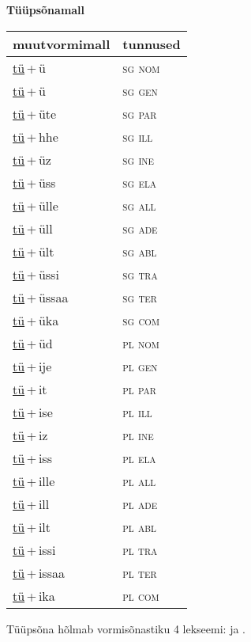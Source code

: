 
\vspace{1.8em}
\begin{minipage}{\textwidth}
\textbf{Tüüpsõnamall \,}\\

\begin{sideways}
\begin{tabular}{l l}
muutvormimall & tunnused \\
\hline
\underline{tü}\,+\,ü & \textsc{ sg nom } \\
\underline{tü}\,+\,ü & \textsc{ sg gen } \\
\underline{tü}\,+\,üte & \textsc{ sg par } \\
\underline{tü}\,+\,hhe & \textsc{ sg ill } \\
\underline{tü}\,+\,üz & \textsc{ sg ine } \\
\underline{tü}\,+\,üss & \textsc{ sg ela } \\
\underline{tü}\,+\,ülle & \textsc{ sg all } \\
\underline{tü}\,+\,üll & \textsc{ sg ade } \\
\underline{tü}\,+\,ült & \textsc{ sg abl } \\
\underline{tü}\,+\,üssi & \textsc{ sg tra } \\
\underline{tü}\,+\,üssaa & \textsc{ sg ter } \\
\underline{tü}\,+\,üka & \textsc{ sg com } \\
\underline{tü}\,+\,üd & \textsc{ pl nom } \\
\underline{tü}\,+\,ije & \textsc{ pl gen } \\
\underline{tü}\,+\,it & \textsc{ pl par } \\
\underline{tü}\,+\,ise & \textsc{ pl ill } \\
\underline{tü}\,+\,iz & \textsc{ pl ine } \\
\underline{tü}\,+\,iss & \textsc{ pl ela } \\
\underline{tü}\,+\,ille & \textsc{ pl all } \\
\underline{tü}\,+\,ill & \textsc{ pl ade } \\
\underline{tü}\,+\,ilt & \textsc{ pl abl } \\
\underline{tü}\,+\,issi & \textsc{ pl tra } \\
\underline{tü}\,+\,issaa & \textsc{ pl ter } \\
\underline{tü}\,+\,ika & \textsc{ pl com } \\
\end{tabular}
\end{sideways}
\label{tab:tüüpsõnamall-tüü}

\end{minipage}

 
\vspace{1em}
\noindent Tüüpsõna hõlmab vormisõnastiku 4 lekseemi:  ja .
